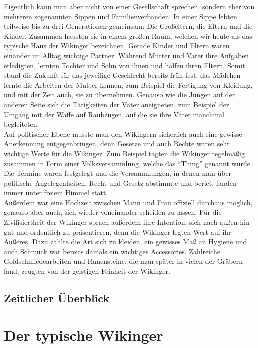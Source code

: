 \documentclass[12pt,a4paper,ngerman]{book}
\newcommand{\fchapter}[1]{\chapter{#1}\thispagestyle{chapterstyle}}
\begin{document}
Eigentlich kann man aber nicht von einer Gesellschaft sprechen, sondern eher von mehreren sogenannten Sippen und Familienverbänden. In einer Sippe lebten teilweise bis zu drei Generationen gemeinsam: Die Großeltern, die Eltern und die Kinder.
Zusammen hausten sie in einem großen Raum, welchen wir heute als das typische Haus der Wikinger bezeichnen. Gerade Kinder und Eltern waren einander im Alltag wichtige Partner. Während Mutter und Vater ihre Aufgaben erledigten,
lernten Tochter und Sohn von ihnen und halfen ihren Eltern. Somit stand die Zukunft für das jeweilige Geschlecht bereits früh fest; das Mädchen lernte die Arbeiten der Mutter kennen, zum Beispiel die Fertigung von Kleidung, und mit der Zeit auch, sie zu übernehmen.
Genauso wie die Jungen auf der anderen Seite sich die Tätigkeiten der Väter aneigneten, zum Beispiel der Umgang mit der Waffe auf Raubzügen, auf die sie ihre Väter manchmal begleiteten.\\
Auf politischer Ebene musste man den Wikingern sicherlich auch eine gewisse Anerkennung entgegenbringen, denn Gesetze und auch Rechte waren sehr wichtige Werte für die Wikinger. Zum Beispiel tagten die Wikinger regelmäßig zusammen in Form einer Volksversammlung,
welche das “Thing” genannt wurde. Die Termine waren festgelegt und die Versammlungen, in denen man über politische Angelegenheiten, Recht und Gesetz abstimmte und beriet, fanden immer unter freiem Himmel statt.\\
Außerdem war eine Hochzeit zwischen Mann und Frau offiziell durchaus möglich, genauso aber auch, sich wieder voneinander scheiden zu lassen. 
Für die Zivilisiertheit der Wikinger sprach außerdem ihre Intention, sich nach außen hin gut und ordentlich zu präsentieren, denn die Wikinger legten Wert auf ihr Äußeres. Dazu zählte die Art sich zu kleiden,
ein gewisses Maß an Hygiene und auch Schmuck war bereits damals ein wichtiges Accessories. Zahlreiche Goldschmiedearbeiten und Runensteine, die man später in vielen der Gräbern fand, zeugten von der geistigen Feinheit der Wikinger. 



\section{Zeitlicher Überblick}



\fchapter{Der typische Wikinger}
\end{document}
